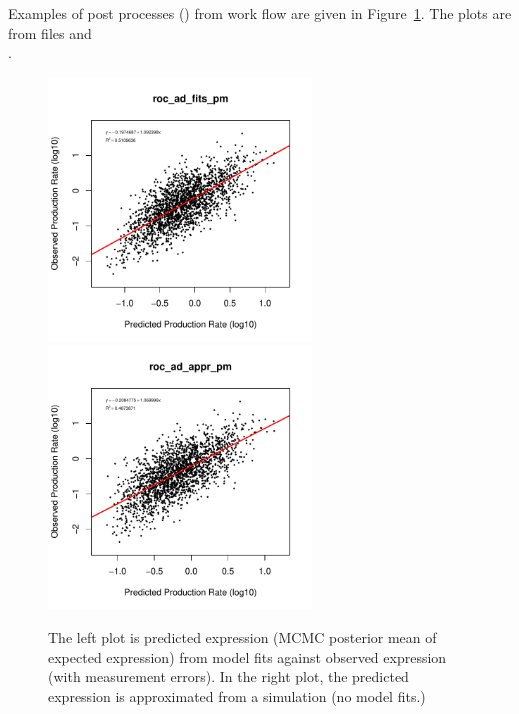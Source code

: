 Examples of post processes () from  work flow
are given in Figure~\ref{fig:prxy}. The plots are from files
 and \\
.
\begin{figure}[ht]
\centering
\includegraphics[width=2.75in]{cubfits-include/figure/prxy_roc_ad_fits_pm_5k-10k}
\includegraphics[width=2.75in]{cubfits-include/figure/prxy_roc_ad_appr_pm_5k-10k}
\caption{The left plot is predicted expression (MCMC posterior mean of expected
expression) from model fits against observed
expression (with measurement errors). In the right plot, the predicted
expression is approximated from a simulation (no model fits.)}
\label{fig:prxy}
\end{figure}
